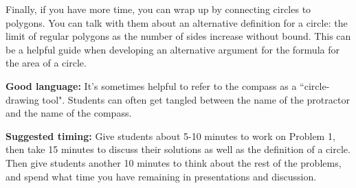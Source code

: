 \documentclass[noauthor,nooutcomes]{ximera}
\begin{document}
\begin{instructorNotes}
Finally, if you have more time, you can wrap up by connecting circles to polygons. You can talk with them about an alternative definition for a circle:  the limit of regular polygons as the number of sides increase without bound.  This can be a helpful guide when developing an alternative argument for the formula for the area of a circle. 

{\bf Good language:} It's sometimes helpful to refer to the compass as a ``circle-drawing tool". Students can often get tangled between the name of the protractor and the name of the compass. 

{\bf Suggested timing:}  Give students about 5-10 minutes to work on Problem 1, then take 15 minutes to discuss their solutions as well as the definition of a circle. Then give students another 10 minutes to think about the rest of the problems, and spend what time you have remaining in presentations and discussion.
\end{instructorNotes}
\end{document}
